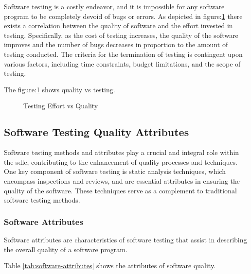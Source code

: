 Software testing is a costly endeavor, and it is impossible for any software program to be completely
devoid of bugs or errors. As depicted in figure:\ref{fig:software_testing_quality} there exists a
correlation between the quality of software and the effort invested in testing. Specifically,
as the cost of testing increases, the quality of the software improves and the number of bugs
decreases in proportion to the amount of testing conducted. The criteria for the termination of
testing is contingent upon various factors, including time constraints, budget limitations, and the
scope of testing.

The figure:\ref{fig:software_testing_quality} shows quality vs testing.


\begin{figure}[h]
    \caption{Testing Effort vs Quality\cite{arumugam2019software}}\label{fig:software_testing_quality}
\end{figure}

\subsection{Software Testing Quality Attributes}

Software testing methods and attributes play a crucial and integral role within the \acrlong{sdlc},
contributing to the enhancement of quality processes and techniques. One key component of software
testing is static analysis techniques, which encompass inspections and reviews, and are essential
attributes in ensuring the quality of the software. These techniques serve as a complement to
traditional software testing methods.


\subsubsection{Software Attributes}
Software attributes are characteristics of software testing that assist in describing the
overall quality of a software program.

Table \ref{tab:software-attributes} shows the attributes of software quality\cite{mili2015software}.

